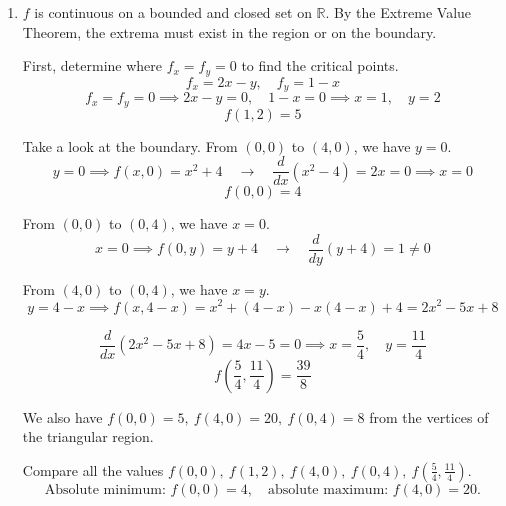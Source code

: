 \documentclass[a4paper, 12pt]{article}
\begin{document}
\begin{enumerate}[leftmargin=*,label=\textbf{\arabic*.}]
\item $f$ is continuous on a bounded and closed set on $\mathbb R$. By the Extreme Value Theorem, the extrema must exist in the region or on the boundary.

First, determine where $f_x=f_y=0$ to find the critical points.
\[f_x=2x-y,\quad f_y=1-x\]
\[f_x=f_y=0\implies2x-y=0,\quad1-x=0\implies x=1,\quad y=2\]
\[f(1,2)=5\]

Take a look at the boundary. From $(0,0)$ to $(4,0)$, we have $y=0$.
\[y=0\implies f(x,0)=x^2+4\quad\rightarrow\quad\frac d{dx}\left(x^2-4\right)=2x=0\implies x=0\]
\[f(0,0)=4\]

From $(0,0)$ to $(0,4)$, we have $x=0$.
\[x=0\implies f(0,y)=y+4\quad\rightarrow\quad\frac d{dy}\left(y+4\right)=1\neq0\]

From $(4,0)$ to $(0,4)$, we have $x=y$.
\[y=4-x\implies f(x,4-x)=x^2+(4-x)-x(4-x)+4=2x^2-5x+8\]

\[\frac d{dx}\left(2x^2-5x+8\right)=4x-5=0\implies x=\frac54,\quad y=\frac{11}4\]
\[f\left(\frac54,\frac{11}4\right)=\frac{39}8\]

We also have $f(0,0)=5,\:f(4,0)=20,\:f(0,4)=8$ from the vertices of the triangular region.

Compare all the values $f(0,0),\:f(1,2),\:f(4,0),\:f(0,4),\:f\left(\frac54,\frac{11}4\right)$.
\[\boxed{\text{Absolute minimum: }f(0,0)=4,\quad \text{absolute maximum: } f(4,0)=20.}\]
\end{enumerate}
\end{document}
